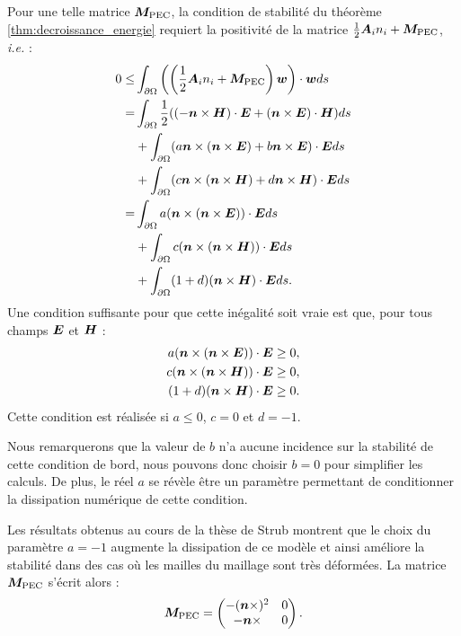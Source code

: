Pour une telle matrice $\bm{M}_{\mathrm{PEC}}$, la condition de stabilité du théorème
\ref{thm:decroissance_energie} requiert la positivité de la matrice
$\frac{1}{2} {\bm{A}_{i}n_{i}} + \bm{M}_{\mathrm{PEC}}$, \textit{i.e.} :
\begin{equation}
	\begin{aligned}
		0 \le &\int_{\partial\Omega}
			\left( \left( \frac{1}{2} {\bm{A}_{i}n_{i}} + \bm{M}_{\mathrm{PEC}} \right) \bm{w} \right)
			\cdot \bm{w} ds \\
		= &\int_{\partial\Omega}
			\frac{1}{2} ((-\bm{n} \times \bm{H}) \cdot \bm{E} +
			(\bm{n} \times \bm{E}) \cdot \bm{H}) ds \\
		&+ \int_{\partial\Omega}
			(a \bm{n} \times (\bm{n} \times \bm{E}) +
			 b \bm{n} \times \bm{E}) \cdot \bm{E} ds \\
		&+ \int_{\partial\Omega}
			(c \bm{n} \times (\bm{n} \times \bm{H}) +
			 d \bm{n} \times \bm{H}) \cdot \bm{E} ds \\
		= &\int_{\partial\Omega}
			a (\bm{n} \times (\bm{n} \times \bm{E})) \cdot \bm{E} ds \\
		&+ \int_{\partial\Omega}
			c (\bm{n} \times (\bm{n} \times \bm{H})) \cdot \bm{E} ds \\
		&+ \int_{\partial\Omega}
			(1 + d) (\bm{n} \times \bm{H}) \cdot \bm{E} ds .
	\end{aligned}
\end{equation}
Une condition suffisante pour que cette inégalité soit vraie est
que, pour tous champs $\bm{E}$ et $\bm{H}$ :
\begin{subequations}
	\begin{align}
		a (\bm{n} \times (\bm{n} \times \bm{E})) \cdot \bm{E} &\ge 0 , \\
		c (\bm{n} \times (\bm{n} \times \bm{H})) \cdot \bm{E} &\ge 0 , \\
		(1 + d) (\bm{n} \times \bm{H}) \cdot \bm{E} &\ge 0 .
	\end{align}
\end{subequations}
Cette condition est réalisée si $a \le 0$, $c = 0$ et $d = -1$.

Nous remarquerons que la valeur de $b$ n'a aucune incidence sur la
stabilité de cette condition de bord, nous pouvons donc choisir
$b = 0$ pour simplifier les calculs. De plus, le réel $a$
se révèle être un paramètre permettant de conditionner
la dissipation numérique de cette condition.

Les résultats obtenus au cours de la thèse de Strub \cite{strub:tel-01651258}
montrent que le choix du paramètre $a = -1$ augmente
la dissipation de ce modèle et ainsi améliore la stabilité
dans des cas où les mailles du maillage sont très déformées.
La matrice $\bm{M}_{\mathrm{PEC}}$ s'écrit alors :
\begin{align}
	\bm{M}_{\mathrm{PEC}} =
	\begin{pmatrix}
		- (\bm{n} \times)^2 & 0 \\
		- \bm{n} \times & 0
	\end{pmatrix} .
\end{align}


